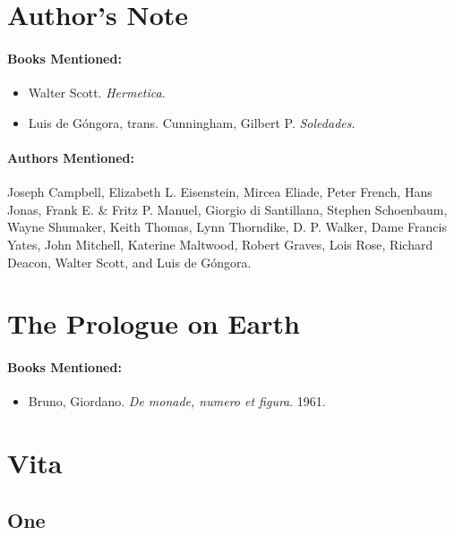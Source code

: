 \documentclass[12pt]{article}
\providecommand{\tightlist}{%
  \setlength{\itemsep}{0pt}\setlength{\parskip}{0pt}}
\begin{document}
\pagebreak 
\section{Author's Note}\label{authors-note}

\paragraph{Books Mentioned:}\label{books-mentioned}

\begin{itemize}
\tightlist
\item
  Walter Scott. \emph{Hermetica}.
\item
  Luis de Góngora, trans. Cunningham, Gilbert P. \emph{Soledades}.
\end{itemize}

\paragraph{Authors Mentioned:}\label{authors-mentioned}
Joseph Campbell, Elizabeth L. Eisenstein, Mircea Eliade, Peter French, Hans Jonas, Frank E. \& Fritz P. Manuel, Giorgio di Santillana, Stephen Schoenbaum, Wayne Shumaker, Keith Thomas, Lynn Thorndike, D. P. Walker, Dame Francis Yates, John Mitchell, Katerine Maltwood, Robert Graves, Lois Rose, Richard Deacon, Walter Scott, and Luis de Góngora.

\section{The Prologue on Earth}\label{the-prologue-on-earth}

\paragraph{Books Mentioned:}\label{books-mentioned-1}

\begin{itemize}
\tightlist
\item
  Bruno, Giordano. \emph{De monade, numero et figura}. 1961.
\end{itemize}

\section{Vita}\label{vita}

\subsection{One}\label{one}
\end{document}

